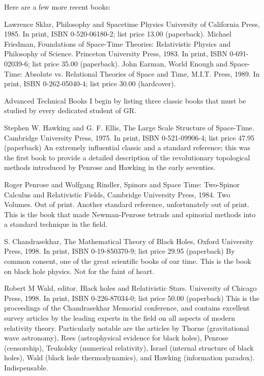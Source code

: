 \documentclass[10pt,a4paper]{book}
\theoremstyle{definition}
\begin{document}
Here are a few more recent books:

Lawrence Sklar,
Philosophy and Spacetime Physics
University of California Press, 1985.
In print, ISBN 0-520-06180-2; list price 13.00 (paperback).
Michael Friedman,
Foundations of Space-Time Theories: Relativistic Physics and Philosophy of Science.
Princeton University Press, 1983.
In print, ISBN 0-691-02039-6; list price 35.00 (paperback).
John Earman,
World Enough and Space-Time: Absolute vs. Relational Theories of Space and Time,
M.I.T. Press, 1989.
In print, ISBN 0-262-05040-4; list price 30.00 (hardcover).



Advanced Technical Books
I begin by listing three classic books that must be studied by every dedicated student of GR.

Stephen W. Hawking and G. F. Ellis,
The Large Scale Structure of Space-Time.
Cambridge University Press, 1975.
In print, ISBN 0-521-09906-4; list price 47.95 (paperback)
An extremely influential classic and a standard reference; this was the first book to provide a detailed description of the revolutionary topological methods introduced by Penrose and Hawking in the early seventies.

Roger Penrose and Wolfgang Rindler,
Spinors and Space Time: Two-Spinor Calculus and Relativistic Fields,
Cambridge University Press, 1984.  Two Volumes.
Out of print.
Another standard reference, unfortunately out of print.  This is the book that made Newman-Penrose tetrads and spinorial methods into a standard technique in the field.

S. Chandrasekhar,
The Mathematical Theory of Black Holes,
Oxford University Press, 1998.
In print, ISBN 0-19-850370-9; list price 29.95 (paperback)
By common consent, one of the great scientific books of our time.  This is the book on black hole physics.  Not for the faint of heart.

Robert M Wald, editor.
Black holes and Relativistic Stars.
University of Chicago Press, 1998.
In print, ISBN 0-226-87034-0; list price 50.00 (paperback)
This is the proceedings of the Chandrasekhar Memorial conference, and contains excellent survey articles by the leading experts in the field on all aspects of modern relativity theory.  Particularly notable are the articles by Thorne (gravitational wave astronomy), Rees (astrophysical evidence for black holes), Penrose (censorship), Teukolsky (numerical relativity), Israel (internal structure of black holes), Wald (black hole thermodynamics), and Hawking (information paradox).  Indispensable.
\end{document}
